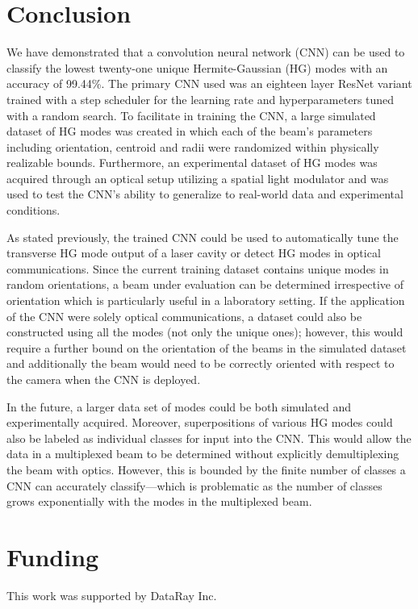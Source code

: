 \documentclass[10pt,journal,compsoc]{IEEEtran}
\begin{document}
\section*{Conclusion}
We have demonstrated that a convolution neural network (CNN) can be used to classify the lowest twenty-one unique Hermite-Gaussian (HG) modes with an accuracy of 99.44\%. The primary CNN used was an eighteen layer ResNet variant trained with a step scheduler for the learning rate and hyperparameters tuned with a random search. To facilitate in training the CNN, a large simulated dataset of HG modes was created in which each of the beam's parameters including orientation, centroid and radii were randomized within physically realizable bounds. Furthermore, an experimental dataset of HG modes was acquired through an optical setup utilizing a spatial light modulator and was used to test the CNN's ability to generalize to real-world data and experimental conditions. 

As stated previously, the trained CNN could be used to automatically tune the transverse HG mode output of a laser cavity or detect HG modes in optical communications. Since the current training dataset contains unique modes in random orientations, a beam under evaluation can be determined irrespective of orientation which is particularly useful in a laboratory setting. If the application of the CNN were solely optical communications, a dataset could also be constructed using all the modes (not only the unique ones); however, this would require a further bound on the orientation of the beams in the simulated dataset and additionally the beam would need to be correctly oriented with respect to the camera when the CNN is deployed.

In the future, a larger data set of modes could be both simulated and experimentally acquired. Moreover, superpositions of various HG modes could also be labeled as individual classes for input into the CNN. This would allow the data in a multiplexed beam to be determined without explicitly demultiplexing the beam with optics. However, this is bounded by the finite number of classes a CNN can accurately classify---which is problematic as the number of classes grows exponentially with the modes in the multiplexed beam.

\section*{Funding}
This work was supported by DataRay Inc.
\end{document}
